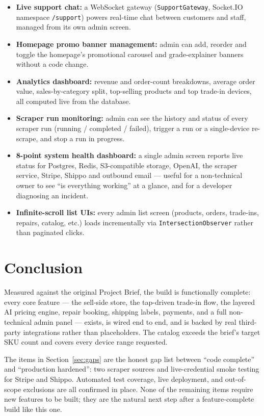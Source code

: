 \documentclass[11pt,a4paper]{article}
\begin{document}
\begin{itemize}
  \item \textbf{Live support chat:} a WebSocket gateway (\texttt{SupportGateway}, Socket.IO namespace \texttt{/support}) powers real-time chat between customers and staff, managed from its own admin screen.
  \item \textbf{Homepage promo banner management:} admin can add, reorder and toggle the homepage's promotional carousel and grade-explainer banners without a code change.
  \item \textbf{Analytics dashboard:} revenue and order-count breakdowns, average order value, sales-by-category split, top-selling products and top trade-in devices, all computed live from the database.
  \item \textbf{Scraper run monitoring:} admin can see the history and status of every scraper run (running / completed / failed), trigger a run or a single-device re-scrape, and stop a run in progress.
  \item \textbf{8-point system health dashboard:} a single admin screen reports live status for Postgres, Redis, S3-compatible storage, OpenAI, the scraper service, Stripe, Shippo and outbound email --- useful for a non-technical owner to see ``is everything working'' at a glance, and for a developer diagnosing an incident.
  \item \textbf{Infinite-scroll list UIs:} every admin list screen (products, orders, trade-ins, repairs, catalog, etc.) loads incrementally via \texttt{IntersectionObserver} rather than paginated clicks.
\end{itemize}

\section{Conclusion}

Measured against the original Project Brief, the build is functionally complete: every core feature --- the sell-side store, the tap-driven trade-in flow, the layered AI pricing engine, repair booking, shipping labels, payments, and a full non-technical admin panel --- exists, is wired end to end, and is backed by real third-party integrations rather than placeholders. The catalog exceeds the brief's target SKU count and covers every device range requested.

The items in Section~\ref{sec:gaps} are the honest gap list between ``code complete'' and ``production hardened'': two scraper sources and live-credential smoke testing for Stripe and Shippo. Automated test coverage, live deployment, and out-of-scope exclusions are all confirmed in place. None of the remaining items require new features to be built; they are the natural next step after a feature-complete build like this one.
\end{document}
